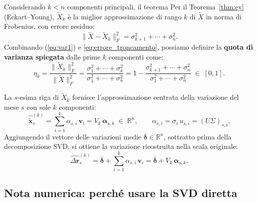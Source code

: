 \documentclass[11pt,a4paper]{article}
\theoremstyle{plain}
\theoremstyle{definition}
\theoremstyle{remark}
\begin{document}
Considerando $k < n$ componenti principali, il teorema 
Per il Teorema~\ref{thm:ey} (Eckart--Young), $\tilde{X}_k$ è la miglior
approssimazione di rango $k$ di $\tilde{X}$ in norma di Frobenius, con
errore residuo:
\begin{equation}
  \|\tilde{X} - \tilde{X}_k\|_F^2
  = \sigma_{k+1}^2 + \cdots + \sigma_n^2.
  \label{eq:errore_troncamento}
\end{equation}
Combinando (\ref{eq:var1}) e \eqref{eq:errore_troncamento}, possiamo definire la \textbf{quota di
varianza spiegata} dalle prime $k$ componenti come:
\begin{equation}
  \eta_k
  = \frac{\|\tilde{X}_k\|_F^2}{\|\tilde{X}\|_F^2}
  = \frac{\sigma_1^2 + \cdots + \sigma_k^2}{\sigma_1^2 + \cdots + \sigma_n^2}
  = 1 - \frac{\sigma_{k+1}^2 + \cdots + \sigma_n^2}{\sigma_1^2 + \cdots + \sigma_n^2}
  \;\in\; [0,1].
  \label{eq:varianza_spiegata}
\end{equation}


La $s$-esima riga di $\tilde{X}_k$ fornisce l'approssimazione centrata
della variazione del mese $s$ con sole $k$ componenti:
\begin{equation}
  \hat{\tilde{\mathbf{x}}}_s^{(k)}
  = \sum_{i=1}^{k} \alpha_{s,i}\,\mathbf{v}_i
  = V_k\,\boldsymbol{\alpha}_{s,k}
  \;\in\; \mathbb{R}^n,
  \qquad
  \alpha_{s,i} = \sigma_i\,u_{s,i} = (U\Sigma)_{s,i}.
  \label{eq:ric_mese_centrata}
\end{equation}
Aggiungendo il vettore delle variazioni medie $\bar{\boldsymbol{\delta}} \in \mathbb{R}^n$,
sottratto prima della decomposizione SVD, si ottiene la variazione ricostruita nella scala originale:
\begin{equation}
  \widehat{\Delta\mathbf{r}}_s^{(k)}
  = \bar{\boldsymbol{\delta}}
  + \sum_{i=1}^{k} \alpha_{s,i}\,\mathbf{v}_i
  = \bar{\boldsymbol{\delta}} + V_k\,\boldsymbol{\alpha}_{s,k}.
  \label{eq:ric_mese_originale}
\end{equation}


\subsection{Nota numerica: perché usare la SVD diretta}
\end{document}
